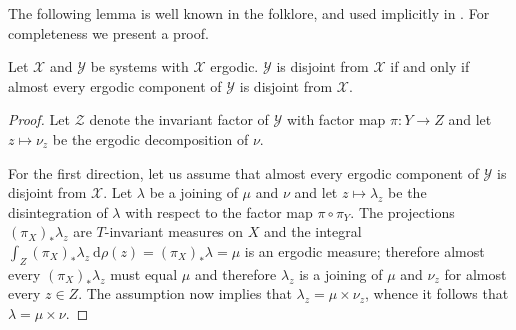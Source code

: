 \documentclass[graybox]{svmult}
\theoremstyle{definition}
\renewcommand{\d}{~\mathrm{d}}
\newcommand{\YY}{\mathcal{Y}}
\newcommand{\ZZ}{\mathcal{Z}}
\begin{document}
The following lemma is well known in the folklore, and used implicitly in \cite{ErgodicPerp,UniquelyErgodicPerp}. 
For completeness we present a proof.

\begin{lemma}\label{lem:DisjointnessAndErgodicDecomposition}
    Let $\mathcal{X}$ and $\mathcal{Y}$ be systems with $\mathcal{X}$ ergodic.
    $\mathcal{Y}$ is disjoint from $\mathcal{X}$ if and only if almost every ergodic component of $\mathcal{Y}$ is disjoint from $\mathcal{X}$.
\end{lemma}

\begin{proof}
Let $\ZZ$ denote the invariant factor of $\YY$ with factor map $\pi:Y\to Z$ and let $z\mapsto\nu_z$ be the ergodic decomposition of $\nu$.

    
    For the first direction, let us assume that almost every ergodic component of $\mathcal{Y}$ is disjoint from $\mathcal{X}$.
    Let $\lambda$ be a joining of $\mu$ and $\nu$ and let $z\mapsto \lambda_z$ be the disintegration of $\lambda$ with respect to the factor map $\pi\circ\pi_Y$.
    The projections $(\pi_X)_*\lambda_z$ are $T$-invariant measures on $X$ and the integral $\int_Z(\pi_X)_*\lambda_z\d\rho(z)=(\pi_X)_*\lambda=\mu$ is an ergodic measure; therefore almost every $(\pi_X)_*\lambda_z$ must equal $\mu$ and therefore $\lambda_z$ is a joining of $\mu$ and $\nu_z$ for almost every $z\in Z$.
    The assumption now implies that $\lambda_z=\mu\times\nu_z$, whence it follows that $\lambda=\mu\times\nu$.




    



\end{proof}
\end{document}
